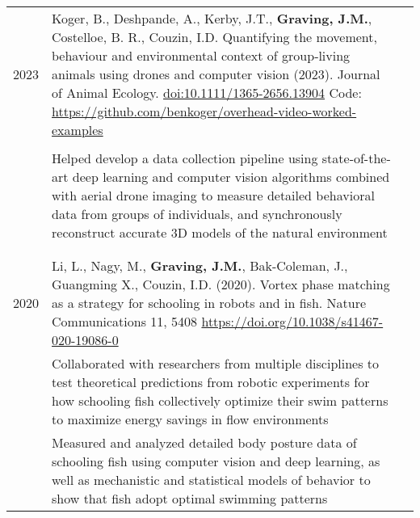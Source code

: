 \documentclass[letterpaper,10pt,oneside]{article}
\newcommand{\tabitem}{\hspace{2mm}\textbullet\hspace{2mm}}
\begin{document}
\begin{small}
\begin{longtable}{@{} l p{5in}l}
\large{2023}
& Koger, B., Deshpande, A., Kerby, J.T., \textbf{Graving, J.M.}, Costelloe, B. R.,  Couzin, I.D. Quantifying the movement, behaviour and environmental context of group‐living animals using drones and computer vision (2023). Journal of Animal Ecology. \href{https://doi.org/10.1111/1365-2656.13904}{doi:10.1111/1365-2656.13904} Code: \href{https://github.com/benkoger/overhead-video-worked-examples}{ https://github.com/benkoger/overhead-video-worked-examples}  \\
& \\
& \tabitem Helped develop a data collection pipeline using state-of-the-art deep learning and computer vision algorithms combined with aerial drone imaging to measure detailed behavioral data from groups of individuals, and synchronously reconstruct accurate 3D models of the natural environment \\
&\\\\

\large{2020}
& Li, L., Nagy, M., \textbf{Graving, J.M.}, Bak-Coleman, J., Guangming X., Couzin, I.D. (2020). Vortex phase matching as a strategy for schooling in robots and in fish. Nature Communications 11, 5408 \href{https://doi.org/10.1038/s41467-020-19086-0 }{https://doi.org/10.1038/s41467-020-19086-0} \vspace{2mm} \\
& 	\tabitem Collaborated with researchers from multiple disciplines to test theoretical predictions from robotic experiments for how schooling fish collectively optimize their swim patterns to maximize energy savings in flow environments \vspace{1mm} \\
& 	\tabitem Measured and analyzed detailed body posture data of schooling fish using computer vision and deep learning, as well as mechanistic and statistical models of behavior to show that fish adopt optimal swimming patterns\vspace{5mm}\\


\end{longtable}
\end{small}
\end{document}
